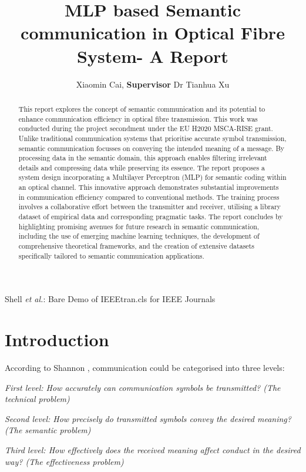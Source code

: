 \documentclass[journal]{IEEEtran}
\begin{document}
\title{MLP based Semantic communication in Optical Fibre System- A Report}
\author{Xiaomin Cai,
      \textbf{ Supervisor} Dr Tianhua Xu
}
%
{Shell \MakeLowercase{\textit{et al.}}: Bare Demo of IEEEtran.cls for IEEE Journals}
\maketitle 
\begin{abstract}
This report explores the concept of semantic communication and its potential to enhance communication efficiency in optical fibre transmission. This work was conducted during the project secondment under the EU H2020 MSCA-RISE grant. Unlike traditional communication systems that prioritise accurate symbol transmission, semantic communication focusses on conveying the intended meaning of a message. By processing data in the semantic domain, this approach enables filtering irrelevant details and compressing data while preserving its essence. The report proposes a system design incorporating a Multilayer Perceptron (MLP) for semantic coding within an optical channel. This innovative approach demonstrates substantial improvements in communication efficiency compared to conventional methods. The training process involves a collaborative effort between the transmitter and receiver, utilising a library dataset of empirical data and corresponding pragmatic tasks. The report concludes by highlighting promising avenues for future research in semantic communication, including the use of emerging machine learning techniques, the development of comprehensive theoretical frameworks, and the creation of extensive datasets specifically tailored to semantic communication applications.
\end{abstract}

\IEEEpeerreviewmaketitle
\section{Introduction}

According to Shannon \cite{shannon_mathematical_1948}, communication could be categorised into three levels:

\textit{First level: How accurately can communication symbols be transmitted? (The technical problem) } 

\textit{Second level: How precisely do transmitted symbols convey the desired meaning? (The semantic problem) }

\textit{Third level: How effectively does the received meaning affect conduct in the desired way? (The effectiveness problem) }
\end{document}
